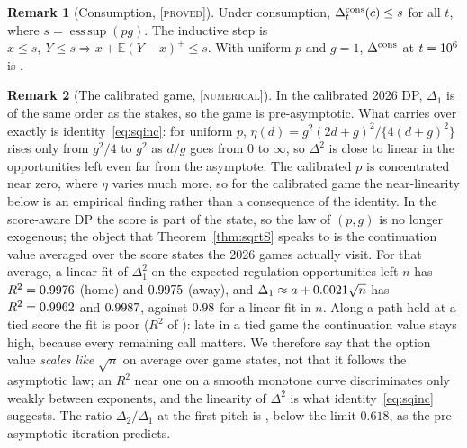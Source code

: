 \documentclass[aoas]{imsart}
\theoremstyle{plain}
\theoremstyle{definition}
\newtheorem{remark}{Remark}
\newcommand{\E}{\mathbb{E}}
\newcommand{\status}[1]{\textup{[\textsc{#1}]}}
\begin{document}
\begin{remark}[Consumption, \status{proved}]
Under consumption, $\Delta^{\rm cons}_t(c)\le s$ for all $t$, where $s=\operatorname{ess\,sup}(pg)$. The
inductive step is
$x\le s,\ Y\le s\Rightarrow x+\E(Y-x)^+\le s$. With uniform $p$ and $g=1$, $\Delta^{\rm cons}$ at $t=10^{6}$ is
\SConsBound.
\end{remark}

\begin{remark}[The calibrated game, \status{numerical}]\label{rem:calibrated}
In the calibrated 2026 DP, $\Delta_1$ is of the same order as the stakes, so the game is pre-asymptotic. What carries
over exactly is identity~\eqref{eq:sqinc}: for uniform $p$, $\eta(d)=g^2(2d+g)^2/\{4(d+g)^2\}$ rises only from
$g^2/4$ to $g^2$ as $d/g$ goes from $0$ to $\infty$, so $\Delta^2$ is close to linear in the opportunities left even
far from the asymptote. The calibrated $p$ is concentrated near zero, where $\eta$ varies much more, so for the
calibrated game the near-linearity below is an empirical finding rather than a consequence of the identity. In the
score-aware DP the score is part of the state, so the law of $(p,g)$ is no longer exogenous; the object that
Theorem~\ref{thm:sqrtS} speaks to is the continuation value averaged over the score states the 2026 games actually
visit. For that average, a linear fit of $\Delta_1^2$ on the expected regulation opportunities left $n$ has
$R^2=0.9976$ (home) and $0.9975$ (away), and $\Delta_1\approx a+0.0021\sqrt n$ has
$R^2=0.9962$ and $0.9987$, against $0.98$ for a linear fit in $n$. Along a path held at a tied score
the fit is poor ($R^2$ of \SqrtRTwoTied): late in a tied game the continuation value stays high, because every
remaining call matters. We therefore say that the option value \emph{scales like} $\sqrt{n}$ on average over game
states, not that it follows the asymptotic law; an $R^2$ near one on a smooth monotone curve discriminates only
weakly between exponents, and the linearity of $\Delta^2$ is what identity~\eqref{eq:sqinc} suggests. The ratio
$\Delta_2/\Delta_1$ at the first pitch is \DeltaRatio, below the limit $0.618$, as the pre-asymptotic iteration
predicts.
\end{remark}
\end{document}
